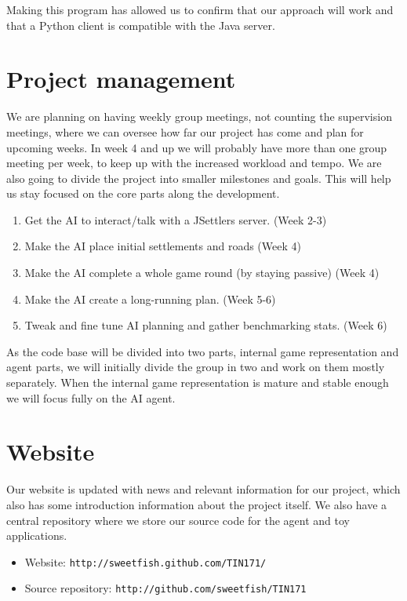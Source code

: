 \documentclass[]{article}
\begin{document}
Making this program has allowed us to confirm that our approach will work and that a Python client is compatible with the Java server.

\section{Project management}
  We are planning on having weekly group meetings, not counting the supervision meetings, where we can oversee how far our project has come and plan for upcoming weeks. In week 4 and up we will probably have more than one group meeting per week, to keep up with the increased workload and tempo. We are also going to divide the project into smaller milestones and goals. This will help us stay focused on the core parts along the development.

\begin{enumerate}
   \item Get the AI to interact/talk with a JSettlers server. (Week 2-3)
   \item Make the AI place initial settlements and roads (Week 4)
   \item Make the AI complete a whole game round (by staying passive) (Week 4)
   \item Make the AI create a long-running plan. (Week 5-6)
   \item Tweak and fine tune AI planning and gather benchmarking stats. (Week 6)
\end{enumerate}

As the code base will be divided into two parts, internal game representation and agent parts, we will initially divide the group in two and work on them mostly separately. When the internal game representation is mature and stable enough we will focus fully on the AI agent.

\section{Website}
Our website is updated with news and relevant information for our project, which also has some introduction information about the project itself. We also have a central repository where we store our source code for the agent and toy applications.

\begin{itemize}
  \item Website: \texttt{http://sweetfish.github.com/TIN171/}
  \item Source repository: \texttt{http://github.com/sweetfish/TIN171}
\end{itemize}



\end{document}
